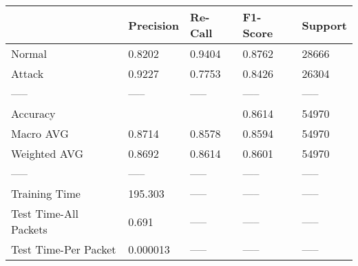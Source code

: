 \begin{tabular}{lllll}
\toprule
{} & Precision & Re-Call & F1-Score & Support \\
\midrule
Normal                &    0.8202 &  0.9404 &   0.8762 &   28666 \\
Attack                &    0.9227 &  0.7753 &   0.8426 &   26304 \\
-----                 &     ----- &   ----- &    ----- &   ----- \\
Accuracy              &           &         &   0.8614 &   54970 \\
Macro AVG             &    0.8714 &  0.8578 &   0.8594 &   54970 \\
Weighted AVG          &    0.8692 &  0.8614 &   0.8601 &   54970 \\
-----                 &     ----- &   ----- &    ----- &   ----- \\
Training Time         &   195.303 &   ----- &    ----- &   ----- \\
Test Time-All Packets &     0.691 &   ----- &    ----- &   ----- \\
Test Time-Per Packet  &  0.000013 &   ----- &    ----- &   ----- \\
\bottomrule
\end{tabular}
